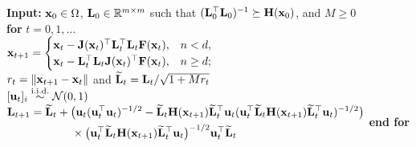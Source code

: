 \documentclass[11pt]{article}
\theoremstyle{plain}
\theoremstyle{definition}
\theoremstyle{remark}
\theoremstyle{plain}
\def\F{{\bf F}}
\def\H{{\bf H}}
\def \J{{\bf J}}
\def\u{{\bf u}}
\def\x{{\bf x}}
\def\RB{{\mathbb R}}
\def \L{{\bf L}}
\begin{document}
\begin{algorithm}[H]
\caption{RQGN with the fast BFGS update}
\label{alg:fbfgs}
\begin{algorithmic}[1]
\STATE \textbf{Input:} $\x_0\in\Omega$, $\L_0\in\RB^{m\times m}$ such that $(\L_0^{\top}\L_0)^{-1}\succeq\H(\x_0)$, and $M\geq0$ \\[0.15cm]
\STATE \textbf{for} $t=0,1,\ldots$ \\[0.15cm]
\STATE \quad $\displaystyle
\x_{t+1}=\begin{cases}
\x_t-\J(\x_t)^{\top}\L_t^{\top}\L_t\F(\x_t),& n<d,\\
\x_t-\L_t^{\top}\L_t\J(\x_t)^{\top}\F(\x_t),& n\geq d;
\end{cases}$ \\[0.15cm]
\STATE \quad $r_t=\|\x_{t+1}-\x_t\|$ and $\widetilde{\L}_t=\L_t/\sqrt{1+Mr_t}$ \\[0.15cm]
\STATE \quad $[\u_t]_i\overset{\mathrm{i.i.d.}}{\sim}\mathcal N(0,1)$ \\[0.15cm]
\STATE \quad $\displaystyle
\begin{aligned}
\L_{t+1}={}&\widetilde{\L}_t+
\big(\u_t(\u_t^\top\u_t)^{-1/2}
-\widetilde{\L}_t\H(\x_{t+1})\widetilde{\L}_t^\top\u_t
(\u_t^\top\widetilde{\L}_t\H(\x_{t+1})\widetilde{\L}_t^\top\u_t)^{-1/2}\big)\\
&~\quad\quad\times
\big(\u_t^\top\widetilde{\L}_t\H(\x_{t+1})\widetilde{\L}_t^\top\u_t\big)^{-1/2}
\u_t^\top\widetilde{\L}_t
\end{aligned}$
\STATE \textbf{end for}
\end{algorithmic}
\end{algorithm}




\end{document}
